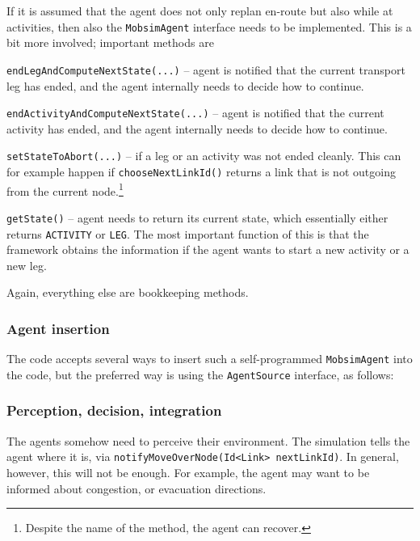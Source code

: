 If it is assumed that the agent does not only replan en-route but also while at activities, then also the \verb$MobsimAgent$ interface needs to be implemented.  This is a bit more involved; important methods are
\begin{compactitem}

\item \verb$endLegAndComputeNextState(...)$ -- agent is notified that the current transport leg has ended, and the agent internally needs to decide how to continue.

\item \verb$endActivityAndComputeNextState(...)$ -- agent is notified that the current activity has ended, and the agent internally needs to decide how to continue.

\item \verb$setStateToAbort(...)$ -- if a leg or an activity was not ended cleanly.  This can for example happen if \verb$chooseNextLinkId()$ returns a link that is not outgoing from the current node.\footnote{%
%
Despite the name of the method, the agent can recover.  %
}

\item \verb$getState()$ -- agent needs to return its current state, which essentially either returns \verb$ACTIVITY$ or \verb$LEG$.  The most important function of this is that the framework obtains the information if the agent wants to start a new activity or a new leg.

\end{compactitem}
Again, everything else are bookkeeping methods.

\subsubsection{Agent insertion}

The code accepts several ways to insert such a self-programmed \verb$MobsimAgent$ into the code, but the preferred way is using the \verb$AgentSource$ interface, as follows:


\subsubsection{Perception, decision, integration}

The agents somehow need to perceive their environment.  The simulation tells the agent where it is, via \verb$notifyMoveOverNode(Id<Link> nextLinkId)$.  In general, however, this will not be enough.  For example, the agent may want to be informed about congestion, or evacuation directions.

